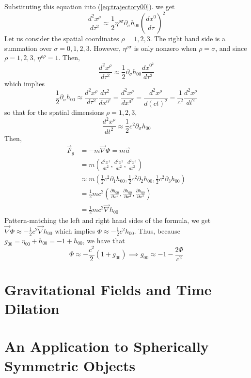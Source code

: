 \documentclass[12pt]{article}
\theoremstyle{definition}
\theoremstyle{remark}
\begin{document}
	Substituting this equation into (\ref{eq:trajectory00}). we get
		\[\frac{d^2x^\rho}{d\tau^2} \approx \frac{1}{2}\eta^{\rho\sigma}\partial_\sigma h_{00}\left(\frac{dx^0}{d\tau}\right)^2\]
	Let us consider the spatial coordinates $\rho = 1,2,3$. The right hand side is a summation over $\sigma = 0,1,2,3$. However, $\eta^{\rho\sigma}$ is only nonzero when $\rho=\sigma$, and since $\rho=1,2,3$, $\eta^{\rho\rho} = 1$. Then, 
		\[\frac{d^2x^\rho}{d\tau^2} \approx \frac{1}{2}\partial_\sigma h_{00}\frac{dx^{0^2}}{d\tau^2}\]
	which implies
		\[\frac{1}{2}\partial_\sigma h_{00}\approx \frac{d^2x^\rho}{d\tau^2} \frac{d\tau^2}{dx^{0^2}} = \frac{d^2x^\rho}{dx^{0^2}} = \frac{d^2x^\rho}{d(ct)^2} = \frac{1}{c^2}\frac{d^2x^\rho}{dt^2}\]
	so that for the spatial dimensions $\rho=1,2,3$,
		\[\frac{d^2x^\rho}{dt^2} \approx \frac{1}{2}c^2\partial_\sigma h_{00}\]
	Then, 
		\begin{align*}
			\vec{F}_g &= -m\vec{\nabla}\Phi = m\vec{a}\\
				&= m\left(\frac{d^2x^1}{dt^2},\frac{d^2x^2}{dt^2},\frac{d^2x^3}{dt^2}\right)\\
				&\approx m\left(\frac{1}{2}c^2\partial_1 h_{00}, \frac{1}{2}c^2\partial_2 h_{00}, \frac{1}{2}c^2\partial_3 h_{00}\right)\\
				&= \frac{1}{2}mc^2\left(\frac{\partial h_{00}}{\partial x^1}, \frac{\partial h_{00}}{\partial x^2}, \frac{\partial h_{00}}{\partial x^3}\right)\\
				&=\boxed{\frac{1}{2}mc^2\vec{\nabla}h_{00}}
		\end{align*}
	Pattern-matching the left and right hand sides of the formula, we get $\vec{\nabla}\Phi \approx -\frac{1}{2}c^2\vec{\nabla}h_{00}$ which implies $\Phi \approx -\frac{1}{2}c^2 h_{00}$. Thus, because $g_{00} = \eta_{00} + h_{00} = -1 + h_{00}$, we have that
		\[\Phi\approx -\frac{c^2}{2}(1 + g_{00})\implies g_{00}\approx -1-\frac{2\Phi}{c^2}\]

	
\section{Gravitational Fields and Time Dilation}

\section{An Application to Spherically Symmetric Objects}













































\end{document}
